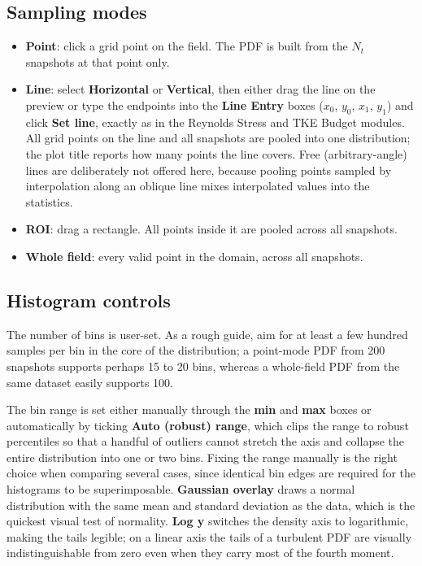 \documentclass[11pt, a4paper]{report}
\newcommand{\uipth}[1]{\textbf{\textcolor{upblue}{#1}}}
\begin{document}
\subsection*{Sampling modes}

\begin{itemize}[leftmargin=1.5em]
  \item \textbf{Point}: click a grid point on the field. The PDF is built from the $N_t$ snapshots at that point only.
  \item \textbf{Line}: select \uipth{Horizontal} or \uipth{Vertical}, then either drag the line on the preview or type the endpoints into the \uipth{Line Entry} boxes ($x_0$, $y_0$, $x_1$, $y_1$) and click \uipth{Set line}, exactly as in the Reynolds Stress and TKE Budget modules. All grid points on the line and all snapshots are pooled into one distribution; the plot title reports how many points the line covers. Free (arbitrary-angle) lines are deliberately not offered here, because pooling points sampled by interpolation along an oblique line mixes interpolated values into the statistics.
  \item \textbf{ROI}: drag a rectangle. All points inside it are pooled across all snapshots.
  \item \textbf{Whole field}: every valid point in the domain, across all snapshots.
\end{itemize}

\subsection*{Histogram controls}

The number of bins is user-set. As a rough guide, aim for at least a few hundred samples per bin in the core of the distribution; a point-mode PDF from 200 snapshots supports perhaps 15 to 20 bins, whereas a whole-field PDF from the same dataset easily supports 100.

The bin range is set either manually through the \uipth{min} and \uipth{max} boxes or automatically by ticking \uipth{Auto (robust) range}, which clips the range to robust percentiles so that a handful of outliers cannot stretch the axis and collapse the entire distribution into one or two bins. Fixing the range manually is the right choice when comparing several cases, since identical bin edges are required for the histograms to be superimposable. \uipth{Gaussian overlay} draws a normal distribution with the same mean and standard deviation as the data, which is the quickest visual test of normality. \uipth{Log y} switches the density axis to logarithmic, making the tails legible; on a linear axis the tails of a turbulent PDF are visually indistinguishable from zero even when they carry most of the fourth moment.
\end{document}
